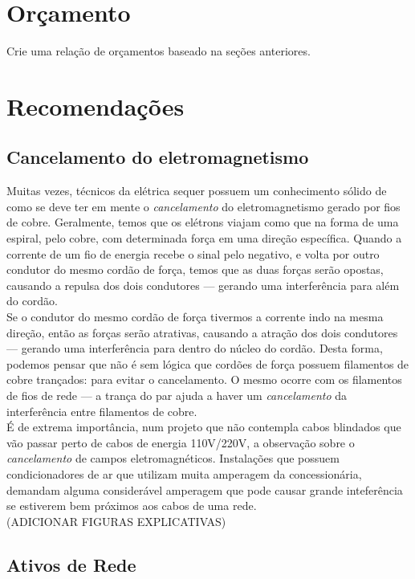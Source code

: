 \documentclass[	DIV=calc,%
							paper=a4,%
							fontsize=12pt,%
							onecolumn]{scrartcl}	 					%
\begin{document}
\section{Orçamento}
Crie uma relação de orçamentos baseado na seções anteriores.

\section{Recomendações}

\subsection{Cancelamento do eletromagnetismo}

Muitas vezes, técnicos da elétrica sequer possuem um conhecimento sólido de como se deve ter em mente o \textit{cancelamento} do eletromagnetismo gerado por fios de cobre. Geralmente, temos que os elétrons viajam como que na forma de uma espiral, pelo cobre, com determinada força em uma direção específica. Quando a corrente de um fio de energia recebe o sinal pelo negativo, e volta por outro condutor do mesmo cordão de força, temos que as duas forças serão opostas, causando a repulsa dos dois condutores --- gerando uma interferência para além do cordão. 
\\

Se o condutor do mesmo cordão de força tivermos a corrente indo na mesma direção, então as forças serão atrativas, causando a atração dos dois condutores --- gerando uma interferência para dentro do núcleo do cordão. Desta forma, podemos pensar que não é sem lógica que cordões de força possuem filamentos de cobre trançados: para evitar o cancelamento. O mesmo ocorre com os filamentos de fios de rede --- a trança do par ajuda a haver um \textit{cancelamento} da interferência entre filamentos de cobre.
\\

É de extrema importância, num projeto que não contempla cabos blindados  que vão passar perto de cabos de energia 110V/220V, a observação sobre o \textit{cancelamento} de campos eletromagnéticos. Instalações que possuem condicionadores de ar que utilizam muita amperagem da concessionária, demandam alguma considerável amperagem que pode causar grande inteferência se estiverem bem próximos aos cabos de uma rede.  
\\

(ADICIONAR FIGURAS EXPLICATIVAS)

\subsection{Ativos de Rede}
\end{document}
